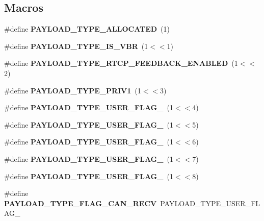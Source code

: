 \subsection*{Macros}
\begin{DoxyCompactItemize}
\item 
\mbox{\label{payloadtype_8h_a98e369093f47fbf345573497dd2e5e9c}} 
\#define {\bfseries P\+A\+Y\+L\+O\+A\+D\+\_\+\+T\+Y\+P\+E\+\_\+\+A\+L\+L\+O\+C\+A\+T\+ED}~(1)
\item 
\mbox{\label{payloadtype_8h_acce6290c637f5da06bd805aa34689940}} 
\#define {\bfseries P\+A\+Y\+L\+O\+A\+D\+\_\+\+T\+Y\+P\+E\+\_\+\+I\+S\+\_\+\+V\+BR}~(1$<$$<$1)
\item 
\mbox{\label{payloadtype_8h_a2fc7358bf817435d0dfe184a63b0f0de}} 
\#define {\bfseries P\+A\+Y\+L\+O\+A\+D\+\_\+\+T\+Y\+P\+E\+\_\+\+R\+T\+C\+P\+\_\+\+F\+E\+E\+D\+B\+A\+C\+K\+\_\+\+E\+N\+A\+B\+L\+ED}~(1$<$$<$2)
\item 
\mbox{\label{payloadtype_8h_a93371b4fd509824d223eee78127fbc0c}} 
\#define {\bfseries P\+A\+Y\+L\+O\+A\+D\+\_\+\+T\+Y\+P\+E\+\_\+\+P\+R\+I\+V1}~(1$<$$<$3)
\item 
\mbox{\label{payloadtype_8h_a731671aa808a35e81dfc034b4ff25b8b}} 
\#define {\bfseries P\+A\+Y\+L\+O\+A\+D\+\_\+\+T\+Y\+P\+E\+\_\+\+U\+S\+E\+R\+\_\+\+F\+L\+A\+G\+\_}~(1$<$$<$4)
\item 
\mbox{\label{payloadtype_8h_a197471eb32c40706e0478888aa6d839b}} 
\#define {\bfseries P\+A\+Y\+L\+O\+A\+D\+\_\+\+T\+Y\+P\+E\+\_\+\+U\+S\+E\+R\+\_\+\+F\+L\+A\+G\+\_}~(1$<$$<$5)
\item 
\mbox{\label{payloadtype_8h_a4e3aa388277b852980899c169997e70b}} 
\#define {\bfseries P\+A\+Y\+L\+O\+A\+D\+\_\+\+T\+Y\+P\+E\+\_\+\+U\+S\+E\+R\+\_\+\+F\+L\+A\+G\+\_}~(1$<$$<$6)
\item 
\mbox{\label{payloadtype_8h_a2ea28895210d75fa68b28d298cff3702}} 
\#define {\bfseries P\+A\+Y\+L\+O\+A\+D\+\_\+\+T\+Y\+P\+E\+\_\+\+U\+S\+E\+R\+\_\+\+F\+L\+A\+G\+\_}~(1$<$$<$7)
\item 
\mbox{\label{payloadtype_8h_ae579568f2febfed9c50bdf0dd9ea33a8}} 
\#define {\bfseries P\+A\+Y\+L\+O\+A\+D\+\_\+\+T\+Y\+P\+E\+\_\+\+U\+S\+E\+R\+\_\+\+F\+L\+A\+G\+\_}~(1$<$$<$8)
\item 
\mbox{\label{payloadtype_8h_a892d876200e737da520674df7109f6c6}} 
\#define {\bfseries P\+A\+Y\+L\+O\+A\+D\+\_\+\+T\+Y\+P\+E\+\_\+\+F\+L\+A\+G\+\_\+\+C\+A\+N\+\_\+\+R\+E\+CV}~P\+A\+Y\+L\+O\+A\+D\+\_\+\+T\+Y\+P\+E\+\_\+\+U\+S\+E\+R\+\_\+\+F\+L\+A\+G\+\_
\item 
\mbox{\label{payloadtype_8h_acfd6fbdc4c4d890658e7bbd6199c7de9}} 

\end{DoxyCompactItemize}
